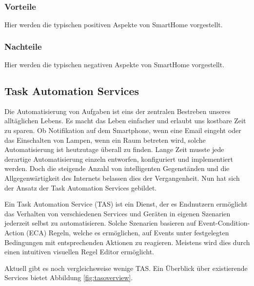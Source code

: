 \subsubsection{Vorteile}
Hier werden die typischen positiven Aspekte von SmartHome vorgestellt.

\subsubsection{Nachteile}
Hier werden die typischen negativen Aspekte von SmartHome vorgestellt.

\subsection{Task Automation Services}
Die Automatisierung von Aufgaben ist eins der zentralen Bestreben unseres alltäglichen Lebens. Es macht das Leben einfacher und erlaubt uns kostbare Zeit zu sparen. Ob Notifikation auf dem Smartphone, wenn eine Email eingeht oder das Einschalten von Lampen, wenn ein Raum betreten wird, solche Automatisierung ist heutzutage überall zu finden. Lange Zeit musste jede derartige Automatisierung einzeln entworfen, konfiguriert und implementiert werden. Doch die steigende Anzahl von intelligenten Gegenständen und die Allgegenwärtigkeit des Internets belassen dies der Vergangenheit. Nun hat sich der Ansatz der Task Automation Services\cite{ieee:tas} gebildet.

Ein Task Automation Service (TAS) ist ein Dienst, der es Endnutzern ermöglicht das Verhalten von verschiedenen Services und Geräten in eigenen Szenarien jederzeit selbst zu automatisieren. Solche Szenarien basieren auf Event-Condition-Action (ECA) Regeln, welche es ermöglichen, auf Events unter festgelegten Bedingungen mit entsprechenden Aktionen zu reagieren. Meistens wird dies durch  einen intuitiven visuellen Regel Editor ermöglicht.


Aktuell gibt es noch vergleichsweise wenige TAS. Ein Überblick über existierende  Services bietet Abbildung \ref{fig:tasoverview}.

